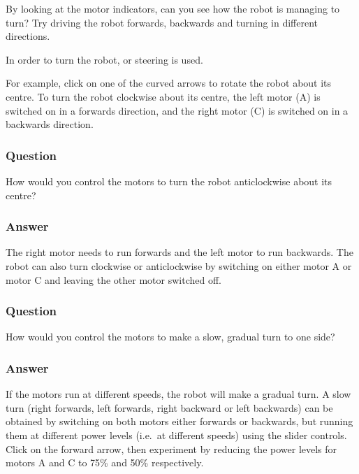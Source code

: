 \documentclass[letterpaper,10pt,english]{sphinxmanual}
\begin{document}
By looking at the motor indicators, can you see how the robot is managing to turn? Try driving the robot forwards, backwards and turning in different directions.

In order to turn the robot,  or  steering is used.

For example, click on one of the curved arrows to rotate the robot about its centre. To turn the robot clockwise about its centre, the left motor (A) is switched on in a forwards direction, and the right motor (C) is switched on in a backwards direction.


\subsubsection{Question}
\label{\detokenize{content/00_SOFTWARE_GUIDE/Section_00_04_LEGACY_UNUSED_IGNORE:Question}}
How would you control the motors to turn the robot anticlockwise about its centre?


\subsubsection{Answer}
\label{\detokenize{content/00_SOFTWARE_GUIDE/Section_00_04_LEGACY_UNUSED_IGNORE:Answer}}
The right motor needs to run forwards and the left motor to run backwards. The robot can also turn clockwise or anticlockwise by switching on either motor A or motor C and leaving the other motor switched off.


\subsubsection{Question}
\label{\detokenize{content/00_SOFTWARE_GUIDE/Section_00_04_LEGACY_UNUSED_IGNORE:id1}}
How would you control the motors to make a slow, gradual turn to one side?


\subsubsection{Answer}
\label{\detokenize{content/00_SOFTWARE_GUIDE/Section_00_04_LEGACY_UNUSED_IGNORE:id2}}
If the motors run at different speeds, the robot will make a gradual turn. A slow turn (right forwards, left forwards, right backward or left backwards) can be obtained by switching on both motors either forwards or backwards, but running them at different power levels (i.e. at different speeds) using the slider controls. Click on the forward arrow, then experiment by reducing the power levels for motors A and C to 75\% and 50\% respectively.
\end{document}
